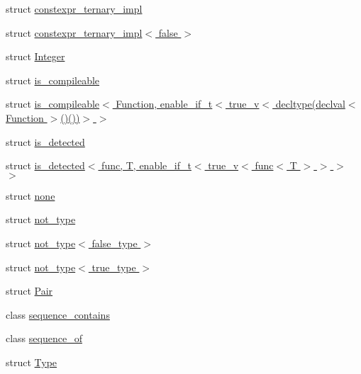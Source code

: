 \begin{DoxyCompactItemize}
struct \hyperlink{structBC_1_1meta_1_1constexpr__ternary__impl}{constexpr\+\_\+ternary\+\_\+impl}
\item 
struct \hyperlink{structBC_1_1meta_1_1constexpr__ternary__impl_3_01false_01_4}{constexpr\+\_\+ternary\+\_\+impl$<$ false $>$}
\item 
struct \hyperlink{structBC_1_1meta_1_1Integer}{Integer}
\item 
struct \hyperlink{structBC_1_1meta_1_1is__compileable}{is\+\_\+compileable}
\item 
struct \hyperlink{structBC_1_1meta_1_1is__compileable_3_01Function_00_01enable__if__t_3_01true__v_3_01decltype_07d8adad13b4eb1e0e26c7d725c9c1dd19e}{is\+\_\+compileable$<$ Function, enable\+\_\+if\+\_\+t$<$ true\+\_\+v$<$ decltype(declval$<$ Function $>$()())$>$ $>$}
\item 
struct \hyperlink{structBC_1_1meta_1_1is__detected}{is\+\_\+detected}
\item 
struct \hyperlink{structBC_1_1meta_1_1is__detected_3_01func_00_01T_00_01enable__if__t_3_01true__v_3_01func_3_01T_01_4_01_4_01_4_01_4}{is\+\_\+detected$<$ func, T, enable\+\_\+if\+\_\+t$<$ true\+\_\+v$<$ func$<$ T $>$ $>$ $>$ $>$}
\item 
struct \hyperlink{structBC_1_1meta_1_1none}{none}
\item 
struct \hyperlink{structBC_1_1meta_1_1not__type}{not\+\_\+type}
\item 
struct \hyperlink{structBC_1_1meta_1_1not__type_3_01false__type_01_4}{not\+\_\+type$<$ false\+\_\+type $>$}
\item 
struct \hyperlink{structBC_1_1meta_1_1not__type_3_01true__type_01_4}{not\+\_\+type$<$ true\+\_\+type $>$}
\item 
struct \hyperlink{structBC_1_1meta_1_1Pair}{Pair}
\item 
class \hyperlink{classBC_1_1meta_1_1sequence__contains}{sequence\+\_\+contains}
\item 
class \hyperlink{classBC_1_1meta_1_1sequence__of}{sequence\+\_\+of}
\item 
struct \hyperlink{structBC_1_1meta_1_1Type}{Type}
\end{DoxyCompactItemize}
